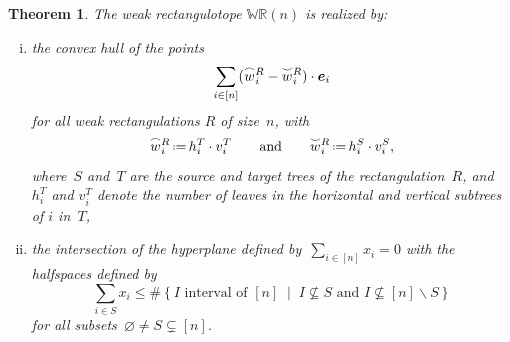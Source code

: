 \documentclass{amsart}
\newtheorem{theorem}{Theorem}%
\theoremstyle{definition}
\newcommand{\R}{\mathbb{R}} %
\renewcommand{\b}[1]{{\boldsymbol{#1}}} %
\newcommand{\set}[2]{\left\{ #1 \;\middle|\; #2 \right\}} %
\newcommand{\ssm}{\smallsetminus} %
\newcommand{\eqdef}{\mbox{\,\raisebox{0.2ex}{\scriptsize\ensuremath{\mathrm:}}\ensuremath{=}\,}} %
\newcommand{\polytope}[1]{\mathds{#1}} %
\newcommand{\WRP}{\polytope{WR}} %
\newcommand{\loday}[1]{\smash{\overset{\frown}{#1}}}
\newcommand{\antiloday}[1]{\smash{\overset{\smile}{#1}}}
\begin{document}
\begin{theorem}
  \label{thm:weakRectangulotope}
The weak rectangulotope $\WRP (n)$ is realized by:
  \begin{enumerate}[(i)]
  \item the convex hull of the points
    \[
    \sum_{i\in [n]} (\loday{w}^R_i - \antiloday{w}^R_i)\cdot \b{e}_i
    \]
    for all weak rectangulations $R$ of size~$n$, with
  \[
    \loday{w}^R_i \eqdef h^T_i\cdot v^T_i
    \qquad\text{and}\qquad
    \antiloday{w}^R_i \eqdef h^S_i\cdot v^S_i,
  \]
  where~$S$ and~$T$ are the source and target trees of the rectangulation~$R$, and $h^T_i$ and $v^T_i$ denote the number of leaves in the horizontal and vertical subtrees of $i$ in~$T$,
\item the intersection of the hyperplane defined by~$\sum_{i \in [n]} x_i = 0$ with the halfspaces defined by
  \[
  \sum_{i \in S} x_i \le \#\set{I \text{ interval of } [n]}{I \not\subseteq S \text{ and } I \not\subseteq [n] \ssm S}
  \]
  for all subsets~$\varnothing \ne S \subsetneq [n]$.
  \end{enumerate}
\end{theorem}
\end{document}
